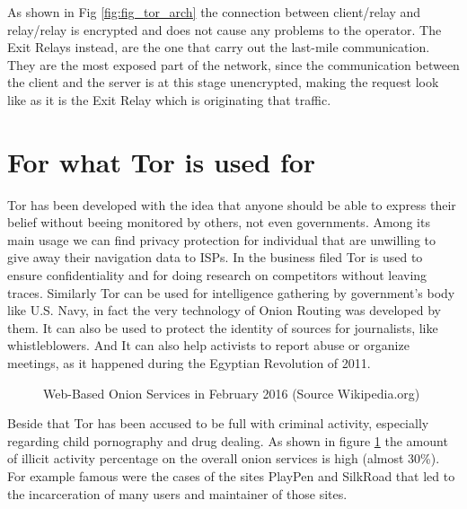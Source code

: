 \documentclass[runningheads,a4paper]{llncs}
\begin{document}
As shown in Fig \ref{fig:fig_tor_arch} the connection between client/relay and relay/relay is encrypted
and does not cause any problems to the operator. The Exit Relays instead, are the one that carry out the 
last-mile communication. They are the most exposed part of the network, since the communication between
the client and the server is at this stage unencrypted, making the request look like as it is the 
Exit Relay which is originating that traffic. 

\section{For what Tor is used for}
Tor has been developed with the idea that anyone should be able to express their belief without beeing monitored by others, not even governments. Among its main usage we can find privacy protection for individual that are unwilling to give away their navigation data to ISPs. In the business filed Tor is used to ensure confidentiality and for doing research on competitors without leaving traces. Similarly Tor can be used for intelligence gathering by government's body like U.S. Navy, in fact the very technology of Onion Routing was developed by them. It can also be used to protect the identity of sources for journalists, like whistleblowers. And It can also help activists to report abuse or organize meetings, as it happened during the Egyptian Revolution of 2011. \cite{WASH_715}

\begin{figure}[]
        \caption{Web-Based Onion Services in February 2016 (Source Wikipedia.org)}
        \label{fig:fig_tor_ill}
\end{figure}

Beside that Tor has been accused to be full with criminal activity, especially regarding child pornography and drug dealing. As shown in figure \ref{fig:fig_tor_ill} the amount of illicit activity percentage on the overall onion services is high (almost 30\%). For example famous were the cases of the sites PlayPen and SilkRoad that led to the incarceration of many users and maintainer of those sites. 
\end{document}
